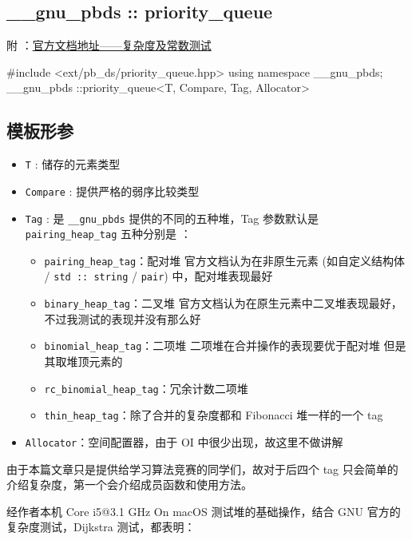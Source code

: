 
\subsection{\_\_gnu\_pbds :: priority\_queue}

附 ：\href{https://gcc.gnu.org/onlinedocs/libstdc++/ext/pb_ds/pq_performance_tests.html#std_mod1}{官方文档地址——复杂度及常数测试}

\begin{cppcode}
#include <ext/pb_ds/priority_queue.hpp>
using namespace __gnu_pbds;
__gnu_pbds ::priority_queue<T, Compare, Tag, Allocator>
\end{cppcode}

\subsection{模板形参}

\begin{itemize}
\item \texttt{T} : 储存的元素类型
\item \texttt{Compare} : 提供严格的弱序比较类型
\item \texttt{Tag} : 是 \texttt{\_\_gnu\_pbds} 提供的不同的五种堆，Tag 参数默认是 \texttt{pairing\_heap\_tag}
  五种分别是 ：
\begin{itemize}
\item \texttt{pairing\_heap\_tag}：配对堆
官方文档认为在非原生元素 (如自定义结构体 / \texttt{std :: string} / \texttt{pair}) 中，配对堆表现最好
\item \texttt{binary\_heap\_tag}：二叉堆 
官方文档认为在原生元素中二叉堆表现最好，不过我测试的表现并没有那么好
\item \texttt{binomial\_heap\_tag}：二项堆
二项堆在合并操作的表现要优于配对堆  但是其取堆顶元素的
\item \texttt{rc\_binomial\_heap\_tag}：冗余计数二项堆
\item \texttt{thin\_heap\_tag}：除了合并的复杂度都和 Fibonacci 堆一样的一个 tag
\end{itemize}
\item \texttt{Allocator}：空间配置器，由于 OI 中很少出现，故这里不做讲解
\end{itemize}

由于本篇文章只是提供给学习算法竞赛的同学们，故对于后四个 tag 只会简单的介绍复杂度，第一个会介绍成员函数和使用方法。

经作者本机 Core i5@3.1 GHz On macOS 测试堆的基础操作，结合 GNU 官方的复杂度测试，Dijkstra 测试，都表明：


